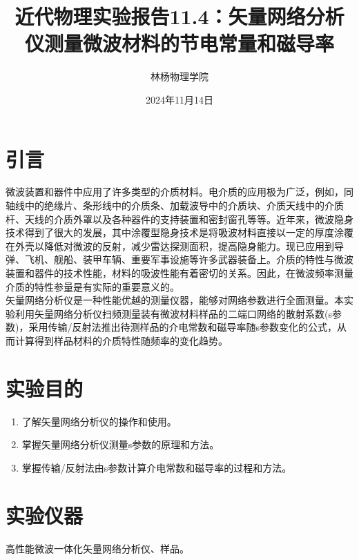 \documentclass[a4paper]{article}
\title{近代物理实验报告11.4：矢量网络分析仪测量微波材料的节电常量和磁导率}
\author{林杨\quad 211840092\quad 物理学院}
\date{2024年11月14日}
\begin{document}
\maketitle


\section{引言}
微波装置和器件中应用了许多类型的介质材料。电介质的应用极为广泛，例如，同轴线中的绝缘片、条形线中的介质条、加载波导中的介质块、介质天线中的介质杆、天线的介质外罩以及各种器件的支持装置和密封窗孔等等。近年来，微波隐身技术得到了很大的发展，其中涂覆型隐身技术是将吸波材料直接以一定的厚度涂覆在外壳以降低对微波的反射，减少雷达探测面积，提高隐身能力。现已应用到导弹、飞机、舰船、装甲车辆、重要军事设施等许多武器装备上。介质的特性与微波装置和器件的技术性能，材料的吸波性能有着密切的关系。因此，在微波频率测量介质的特性参量是有实际的重要意义的。\\
矢量网络分析仪是一种性能优越的测量仪器，能够对网络参数进行全面测量。本实验利用矢量网络分析仪扫频测量装有微波材料样品的二端口网络的散射系数(s参数)，采用传输/反射法推出待测样品的介电常数和磁导率随s参数变化的公式，从而计算得到样品材料的介质特性随频率的变化趋势。

\section{实验目的}
\begin{enumerate}
\item 了解矢量网络分析仪的操作和使用。
\item 掌握矢量网络分析仪测量s参数的原理和方法。
\item 掌握传输/反射法由s参数计算介电常数和磁导率的过程和方法。
\end{enumerate}

\section{实验仪器}
高性能微波一体化矢量网络分析仪、样品。
\end{document}
